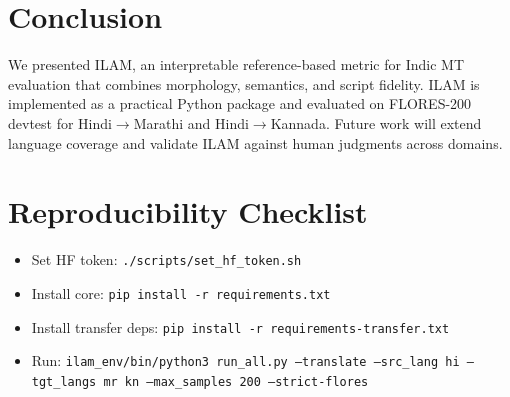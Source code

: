 \documentclass[conference]{IEEEtran}
\begin{document}
\section{Conclusion}
We presented ILAM, an interpretable reference-based metric for Indic MT evaluation that combines morphology, semantics, and script fidelity. ILAM is implemented as a practical Python package and evaluated on FLORES-200 devtest for Hindi$\rightarrow$Marathi and Hindi$\rightarrow$Kannada. Future work will extend language coverage and validate ILAM against human judgments across domains.

\section*{Reproducibility Checklist}
\begin{itemize}
  \item Set HF token: \texttt{./scripts/set\_hf\_token.sh}
  \item Install core: \texttt{pip install -r requirements.txt}
  \item Install transfer deps: \texttt{pip install -r requirements-transfer.txt}
  \item Run: \texttt{ilam\_env/bin/python3 run\_all.py --translate --src\_lang hi --tgt\_langs mr kn --max\_samples 200 --strict-flores}
\end{itemize}



\end{document}
